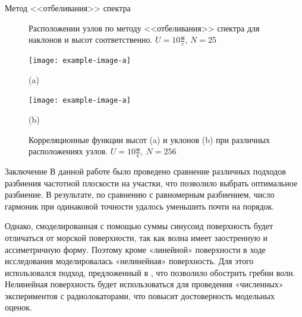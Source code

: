 \begin{frame}[t]{}
\begin{columns}[t]
\begin{column}{.48\linewidth}
\begin{block}{Метод <<отбеливания>> спектра}
\begin{figure}[H]
                    \caption{Расположении узлов по методу <<отбеливания>> спектра  для наклонов и высот соответственно. $U=10 \frac{\text{м}}{c}$, $N=25$}
                    \label{fig:splits}		
                \end{figure}

                \begin{figure}[h]
                    \centering
                    \begin{minipage}{0.49\linewidth}
                            \centering
                            \texttt{[image: example-image-a]}

                            (a)
                    \end{minipage}
                    \begin{minipage}{0.49\linewidth}
                            \centering
                            \texttt{[image: example-image-a]}

                            (b)
                    \end{minipage}
                    \caption{Корреляционные функции высот (a) и уклонов (b) при различных расположениях узлов. $U=10\frac{\text{м}}{\text{с}},~ N = 256$ }
                    \label{fig:}
                \end{figure}
        \end{block}
        \begin{block}{Заключение}
            В данной работе было проведено сравнение различных подходов разбиения частотной плоскости на участки, что позволило выбрать оптимальное разбиение. В результате, по сравнению с равномерным разбиением, число гармоник при одинаковой точности удалось уменьшить почти на порядок.

Однако, смоделированная с помощью суммы синусоид поверхность будет отличаться от морской поверхности, так как волна имеет заостренную и ассиметричную форму.
Поэтому кроме «линейной» поверхности в ходе исследования моделировалась «нелинейная» поверхность.
Для этого использовался подход, предложенный в \cite{CWM}, что позволило обострить гребни волн.
Нелинейная поверхность будет использоваться для проведения «численных» экспериментов с радиолокаторами, что повысит достоверность модельных оценок.



\end{block}
\end{column}
\end{columns}
\end{frame}
